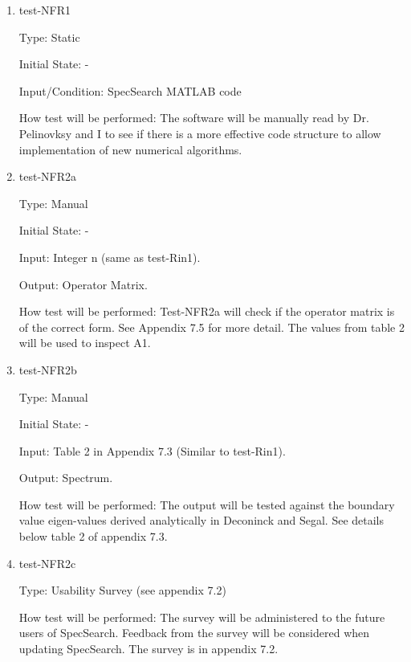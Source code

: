 \documentclass[12pt, titlepage]{article}
\begin{document}
\begin{enumerate}

\item{test-NFR1\\}

Type: Static
					
Initial State: -
					
Input/Condition: SpecSearch MATLAB code
					
How test will be performed: The software will be manually read by Dr. 
Pelinovksy and I to see if there is a more effective code structure to allow 
implementation of new numerical algorithms. 

\item{test-NFR2a\\} 

Type: Manual 

Initial State: -

Input: Integer n (same as test-Rin1).

Output: Operator Matrix.

How test will be performed: Test-NFR2a will check if the operator matrix is of 
the correct form. See Appendix 7.5 for more detail. The values from table 2 
will be used to inspect A1.   \\

\item{test-NFR2b\\} 

Type: Manual 

Initial State: -

Input: Table 2 in Appendix 7.3 (Similar to test-Rin1).

Output: Spectrum.

How test will be performed: The output will be tested against the boundary 
value eigen-values derived analytically in Deconinck and Segal. See details 
below table 2 of appendix 7.3. \\ 

\item{test-NFR2c\\} 

Type: Usability Survey (see appendix 7.2) 

How test will be performed: The survey will be administered to the future users 
of SpecSearch. Feedback from the survey will be considered when updating 
SpecSearch. The survey is in appendix 7.2. 

\end{enumerate}

\newpage
\end{document}
